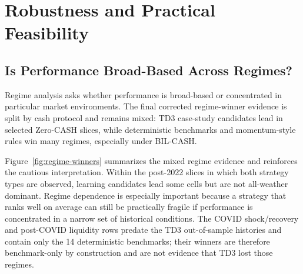 \documentclass[11pt]{article}
\newcommand{\cashzero}{Zero-CASH}
\newcommand{\cashbil}{BIL-CASH}
\begin{document}
\section{Robustness and Practical Feasibility}

\subsection{Is Performance Broad-Based Across Regimes?}

Regime analysis asks whether performance is broad-based or concentrated in particular market environments. The final corrected regime-winner evidence is split by cash protocol and remains mixed: TD3 case-study candidates lead in selected \cashzero{} slices, while deterministic benchmarks and momentum-style rules win many regimes, especially under \cashbil{}.

Figure~\ref{fig:regime-winners} summarizes the mixed regime evidence and reinforces the cautious interpretation. Within the post-2022 slices in which both strategy types are observed, learning candidates lead some cells but are not all-weather dominant. Regime dependence is especially important because a strategy that ranks well on average can still be practically fragile if performance is concentrated in a narrow set of historical conditions. The COVID shock/recovery and post-COVID liquidity rows predate the TD3 out-of-sample histories and contain only the 14 deterministic benchmarks; their winners are therefore benchmark-only by construction and are not evidence that TD3 lost those regimes.
\end{document}
